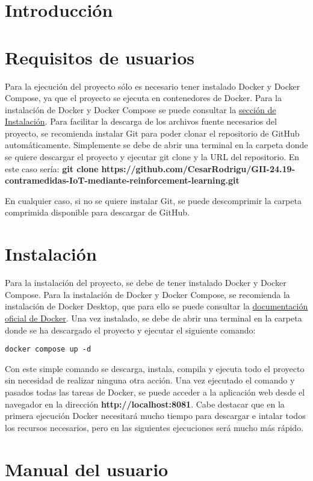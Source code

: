
\section{Introducción}

\section{Requisitos de usuarios}
\label{sec:requisitos-usuarios}

Para la ejecución del proyecto sólo es necesario tener instalado Docker y Docker Compose, ya que el proyecto se ejecuta en contenedores de Docker. Para la instalación de Docker y Docker Compose se puede consultar la \hyperref[sec:instalacion]{sección de Instalación}.
Para facilitar la descarga de los archivos fuente necesarios del proyecto, se recomienda instalar Git para poder clonar el repositorio de GitHub automáticamente. Simplemente se debe de abrir una terminal en la carpeta donde se quiere descargar el proyecto y ejecutar git clone y la URL del repositorio. En este caso sería: \textbf{git clone https://github.com/CesarRodrigu/GII-24.19-contramedidas-IoT-mediante-reinforcement-learning.git}

En cualquier caso, si no se quiere instalar Git, se puede descomprimir la carpeta comprimida disponible para descargar de GitHub.

\section{Instalación}
\label{sec:instalacion}
Para la instalación del proyecto, se debe de tener instalado Docker y Docker Compose. Para la instalación de Docker y Docker Compose, se recomienda la instalación de Docker Desktop, que para ello se puede consultar la \href{https://docs.docker.com/get-docker/}{documentación oficial de Docker}. Una vez instalado, se debe de abrir una terminal en la carpeta donde se ha descargado el proyecto y ejecutar el siguiente comando:
\begin{verbatim}
docker compose up -d
\end{verbatim}
Con este simple comando se descarga, instala, compila y ejecuta todo el proyecto sin necesidad de realizar ninguna otra acción.
Una vez ejecutado el comando y pasados todas las tareas de Docker, se puede acceder a la aplicación web desde el navegador en la dirección \textbf{http://localhost:8081}. Cabe destacar que en la primera ejecución Docker necesitará mucho tiempo para descargar e intalar todos los recursos necesarios, pero en las siguientes ejecuciones será mucho más rápido.

\section{Manual del usuario}


